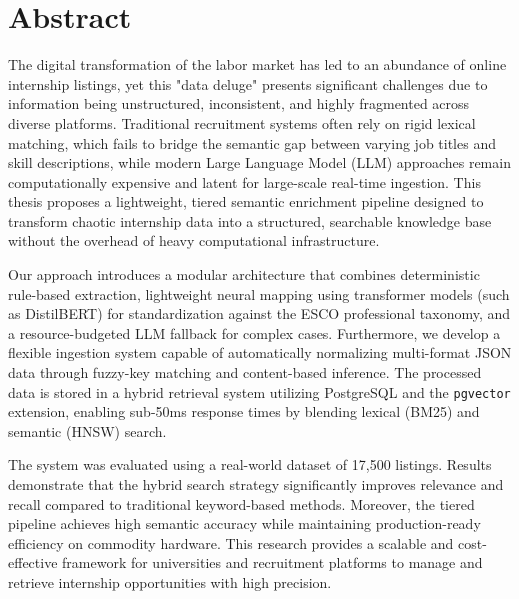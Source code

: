 \chapter*{Abstract}

The digital transformation of the labor market has led to an abundance of online internship listings, yet this "data deluge" presents significant challenges due to information being unstructured, inconsistent, and highly fragmented across diverse platforms. Traditional recruitment systems often rely on rigid lexical matching, which fails to bridge the semantic gap between varying job titles and skill descriptions, while modern Large Language Model (LLM) approaches remain computationally expensive and latent for large-scale real-time ingestion. This thesis proposes a lightweight, tiered semantic enrichment pipeline designed to transform chaotic internship data into a structured, searchable knowledge base without the overhead of heavy computational infrastructure.

Our approach introduces a modular architecture that combines deterministic rule-based extraction, lightweight neural mapping using transformer models (such as DistilBERT) for standardization against the ESCO professional taxonomy, and a resource-budgeted LLM fallback for complex cases. Furthermore, we develop a flexible ingestion system capable of automatically normalizing multi-format JSON data through fuzzy-key matching and content-based inference. The processed data is stored in a hybrid retrieval system utilizing PostgreSQL and the \texttt{pgvector} extension, enabling sub-50ms response times by blending lexical (BM25) and semantic (HNSW) search.

The system was evaluated using a real-world dataset of 17,500 listings. Results demonstrate that the hybrid search strategy significantly improves relevance and recall compared to traditional keyword-based methods. Moreover, the tiered pipeline achieves high semantic accuracy while maintaining production-ready efficiency on commodity hardware. This research provides a scalable and cost-effective framework for universities and recruitment platforms to manage and retrieve internship opportunities with high precision.

